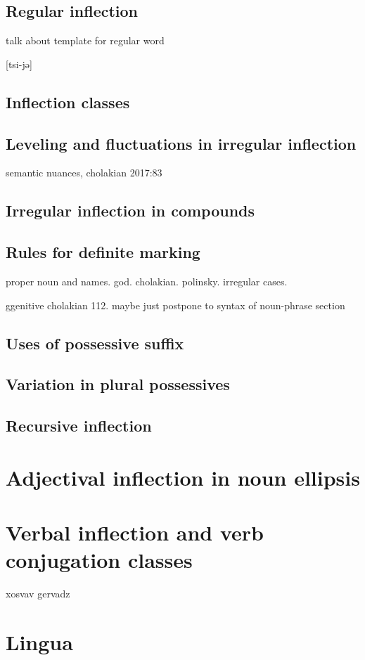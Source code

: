 \section{Regular inflection}
talk about template for regular word 

{[tsi-jə]}

\section{Inflection classes}
\section{Leveling and fluctuations in irregular inflection}
semantic nuances, cholakian 2017:83
\section{Irregular inflection in compounds}
\section{Rules for definite marking}
proper noun and names. god. cholakian. polinsky. irregular cases.

ggenitive cholakian 112. maybe just postpone to syntax of noun-phrase section

\section{Uses of possessive suffix}
\section{Variation in plural possessives}
\section{Recursive inflection}

\chapter{Adjectival inflection in noun ellipsis} 
\chapter{Verbal inflection and verb conjugation classes}

xosvav
gervadz
\chapter{Lingua}

